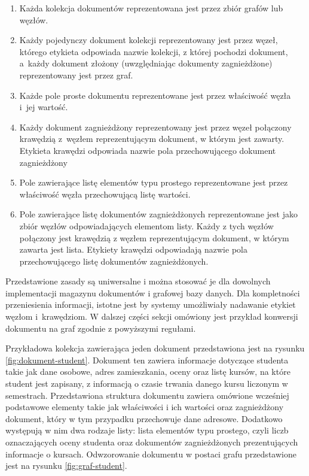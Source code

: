 \documentclass[a4paper,twoside,12pt]{book}
\begin{document}
\begin{enumerate}
\item Każda kolekcja dokumentów reprezentowana jest przez zbiór grafów lub węzłów.
\item Każdy pojedynczy dokument kolekcji reprezentowany jest przez węzeł, którego
etykieta odpowiada nazwie kolekcji, z której pochodzi dokument, a~każdy dokument złożony (uwzględniając dokumenty zagnieżdżone) reprezentowany jest przez graf. 
\item Każde pole proste dokumentu reprezentowane jest przez właściwość węzła i~jej wartość.
\item Każdy dokument zagnieżdżony reprezentowany jest przez węzeł połączony krawędzią z~węzłem reprezentującym dokument, w którym jest zawarty. Etykieta krawędzi odpowiada nazwie pola przechowującego dokument zagnieżdżony
\item Pole zawierające listę elementów typu prostego reprezentowane jest przez właściwość węzła przechowującą listę wartości.
\item Pole zawierające listę dokumentów zagnieżdżonych reprezentowane jest jako zbiór węzłów odpowiadających elementom listy. Każdy z tych węzłów połączony jest krawędzią z węzłem reprezentującym dokument, w którym zawarta jest lista. Etykiety krawędzi odpowiadają nazwie pola przechowującego listę dokumentów zagnieżdżonych.
\end{enumerate}

Przedstawione zasady są uniwersalne i można stosować je dla dowolnych implementacji magazynu dokumentów i grafowej bazy danych. Dla kompletności przeniesienia informacji, istotne jest by systemy umożliwiały nadawanie etykiet węzłom i~krawędziom. W dalszej części sekcji omówiony jest przykład konwersji dokumentu na graf zgodnie z powyższymi regułami.

Przykładowa kolekcja zawierająca jeden dokument przedstawiona jest na rysunku \ref{fig:dokument-student}. Dokument ten zawiera informacje dotyczące studenta takie jak dane osobowe, adres zamieszkania, oceny oraz listę kursów, na które student jest zapisany, z informacją o czasie trwania danego kursu liczonym w semestrach. Przedstawiona struktura dokumentu zawiera omówione wcześniej podstawowe elementy takie jak właściwości i ich wartości oraz zagnieżdżony dokument, który w tym przypadku przechowuje dane adresowe. Dodatkowo występują w nim dwa rodzaje listy: lista elementów typu prostego, czyli liczb oznaczających oceny studenta oraz dokumentów zagnieżdżonych prezentujących informacje o kursach. Odwzorowanie dokumentu w postaci grafu przedstawione jest na rysunku \ref{fig:graf-student}.
\end{document}
